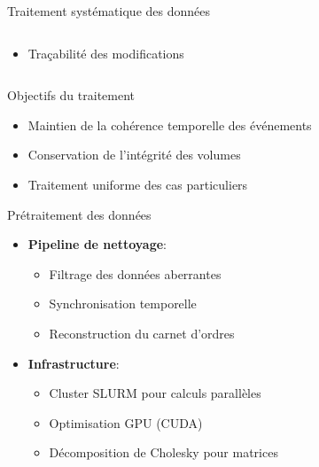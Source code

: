 \documentclass[aspectratio=169]{beamer}  %
\begin{document}
\begin{frame}{Traitement systématique des données}
\begin{columns}
\begin{column}{0.5\textwidth}
\begin{itemize}
\begin{itemize}
                    \item \footnotesize{Traçabilité des modifications}
                \end{itemize}
            \end{itemize}
        \end{column}
    \end{columns}
    \begin{alertblock}{Objectifs du traitement}
        \begin{itemize}
            \item Maintien de la cohérence temporelle des événements
            \item Conservation de l'intégrité des volumes
            \item Traitement uniforme des cas particuliers
        \end{itemize}
    \end{alertblock}
\end{frame}

\begin{frame}{Prétraitement des données}
    \begin{itemize}
        \item \textbf{Pipeline de nettoyage}:
        \begin{itemize}
            \item Filtrage des données aberrantes
            \item Synchronisation temporelle
            \item Reconstruction du carnet d'ordres
        \end{itemize}
        \item \textbf{Infrastructure}:
        \begin{itemize}
            \item Cluster SLURM pour calculs parallèles
            \item Optimisation GPU (CUDA)
            \item Décomposition de Cholesky pour matrices
        \end{itemize}
    \end{itemize}
\end{frame}
\end{document}
